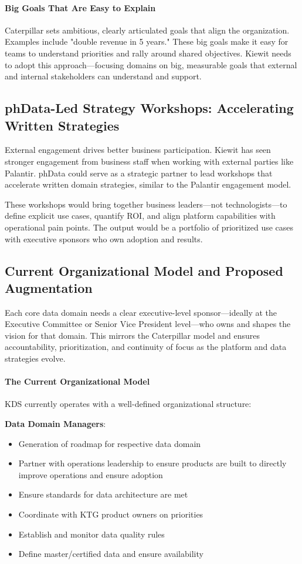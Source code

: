 \documentclass[12pt, a4paper]{article}
\begin{document}
\paragraph{Big Goals That Are Easy to Explain}
Caterpillar sets ambitious, clearly articulated goals that align the organization. Examples include "double revenue in 5 years." These big goals make it easy for teams to understand priorities and rally around shared objectives. Kiewit needs to adopt this approach—focusing domains on big, measurable goals that external and internal stakeholders can understand and support.

\subsection{phData-Led Strategy Workshops: Accelerating Written Strategies}

External engagement drives better business participation. Kiewit has seen stronger engagement from business staff when working with external parties like Palantir. phData could serve as a strategic partner to lead workshops that accelerate written domain strategies, similar to the Palantir engagement model.

These workshops would bring together business leaders—not technologists—to define explicit use cases, quantify ROI, and align platform capabilities with operational pain points. The output would be a portfolio of prioritized use cases with executive sponsors who own adoption and results.

\subsection{Current Organizational Model and Proposed Augmentation}

Each core data domain needs a clear executive-level sponsor—ideally at the Executive Committee or Senior Vice President level—who owns and shapes the vision for that domain. This mirrors the Caterpillar model and ensures accountability, prioritization, and continuity of focus as the platform and data strategies evolve.

\paragraph{The Current Organizational Model}
KDS currently operates with a well-defined organizational structure:

\textbf{Data Domain Managers}:
\begin{itemize}[leftmargin=*, nosep]
    \item Generation of roadmap for respective data domain
    \item Partner with operations leadership to ensure products are built to directly improve operations and ensure adoption
    \item Ensure standards for data architecture are met
    \item Coordinate with KTG product owners on priorities
    \item Establish and monitor data quality rules
    \item Define master/certified data and ensure availability
\end{itemize}
\end{document}
